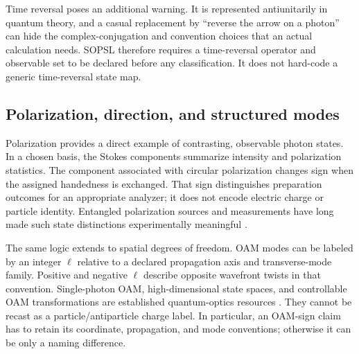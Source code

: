 \documentclass[conference]{../../../../Conference-LaTeX-template_10-17-19/IEEEtran}
\begin{document}
Time reversal poses an additional warning. It is represented antiunitarily in quantum theory, and a casual replacement by ``reverse the arrow on a photon'' can hide the complex-conjugation and convention choices that an actual calculation needs. SOPSL therefore requires a time-reversal operator and observable set to be declared before any classification. It does not hard-code a generic time-reversal state map.

\subsection{Polarization, direction, and structured modes}
Polarization provides a direct example of contrasting, observable photon states. In a chosen basis, the Stokes components summarize intensity and polarization statistics. The component associated with circular polarization changes sign when the assigned handedness is exchanged. That sign distinguishes preparation outcomes for an appropriate analyzer; it does not encode electric charge or particle identity. Entangled polarization sources and measurements have long made such state distinctions experimentally meaningful \cite{kwiat1995}.

The same logic extends to spatial degrees of freedom. OAM modes can be labeled by an integer $\ell$ relative to a declared propagation axis and transverse-mode family. Positive and negative $\ell$ describe opposite wavefront twists in that convention. Single-photon OAM, high-dimensional state spaces, and controllable OAM transformations are established quantum-optics resources \cite{krenn2017,leach2009,erhard2017,gauthier2017}. They cannot be recast as a particle/antiparticle charge label. In particular, an OAM-sign claim has to retain its coordinate, propagation, and mode conventions; otherwise it can be only a naming difference.
\end{document}

